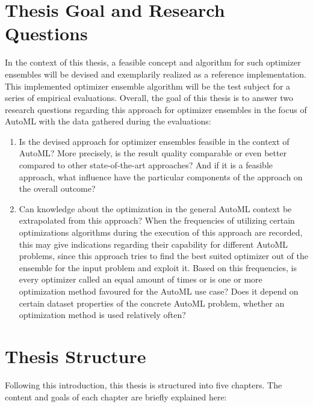 \section{Thesis Goal and Research Questions}
\label{sec:intro:goal}
In the context of this thesis, a feasible concept and algorithm for such optimizer ensembles will be devised and exemplarily realized as a reference implementation.
This  implemented optimizer ensemble algorithm will be the test subject for a series of empirical evaluations.\newline
Overall, the goal of this thesis is to answer two research questions regarding this approach for optimizer ensembles in the focus of AutoML with the data gathered during the evaluations:
\begin{enumerate}
    \item Is the devised approach for optimizer ensembles feasible in the context of AutoML?
    More precisely, is the result quality comparable or even better compared to other state-of-the-art approaches?
    And if it is a feasible approach, what influence have the particular components of the approach on the overall outcome?
    \item Can knowledge about the optimization in the general AutoML context be extrapolated from this approach?
    When the frequencies of utilizing certain optimizations algorithms during the execution of this approach are recorded, this may give indications regarding their capability for different AutoML problems, since this approach tries to find the best suited optimizer out of the ensemble for the input problem and exploit it.
    Based on this frequencies, is every optimizer called an equal amount of times or is one or more optimization method favoured for the AutoML use case?
    Does it depend on certain dataset properties of the concrete AutoML problem, whether an optimization method is used relatively often?
\end{enumerate}

\section{Thesis Structure}
\label{sec:intro:structure}
Following this introduction, this thesis is structured into five chapters.
The content and goals of each chapter are briefly explained here:

